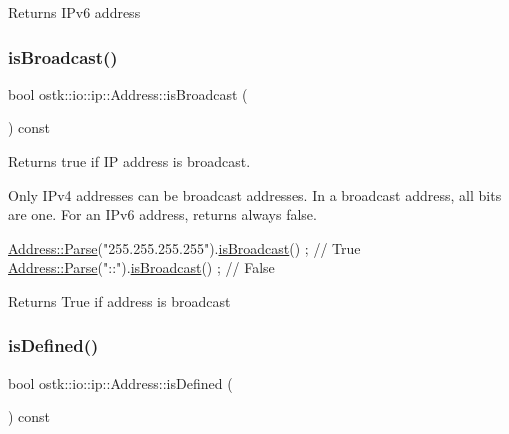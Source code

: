 \begin{DoxyReturn}{Returns}
I\+Pv6 address 
\end{DoxyReturn}
\mbox{\label{classostk_1_1io_1_1ip_1_1_address_a90251b4663992d0e64d3708da55006a9}} 
\subsubsection{\texorpdfstring{is\+Broadcast()}{isBroadcast()}}
{\footnotesize\ttfamily bool ostk\+::io\+::ip\+::\+Address\+::is\+Broadcast (\begin{DoxyParamCaption}{ }\end{DoxyParamCaption}) const}



Returns true if IP address is broadcast. 

Only I\+Pv4 addresses can be broadcast addresses. In a broadcast address, all bits are one. For an I\+Pv6 address, returns always false.


\begin{DoxyCode}
\hyperlink{classostk_1_1io_1_1ip_1_1_address_a3d60e44d816e30f17db36f9bb7ac6307}{Address::Parse}(\textcolor{stringliteral}{"255.255.255.255"}).\hyperlink{classostk_1_1io_1_1ip_1_1_address_a90251b4663992d0e64d3708da55006a9}{isBroadcast}() ; \textcolor{comment}{// True}
\hyperlink{classostk_1_1io_1_1ip_1_1_address_a3d60e44d816e30f17db36f9bb7ac6307}{Address::Parse}(\textcolor{stringliteral}{"::"}).\hyperlink{classostk_1_1io_1_1ip_1_1_address_a90251b4663992d0e64d3708da55006a9}{isBroadcast}() ; \textcolor{comment}{// False}
\end{DoxyCode}


\begin{DoxyReturn}{Returns}
True if address is broadcast 
\end{DoxyReturn}
\mbox{\label{classostk_1_1io_1_1ip_1_1_address_a04478bd4c7c226c0fe7043ef63ec48d1}} 
\subsubsection{\texorpdfstring{is\+Defined()}{isDefined()}}
{\footnotesize\ttfamily bool ostk\+::io\+::ip\+::\+Address\+::is\+Defined (\begin{DoxyParamCaption}{ }\end{DoxyParamCaption}) const}



